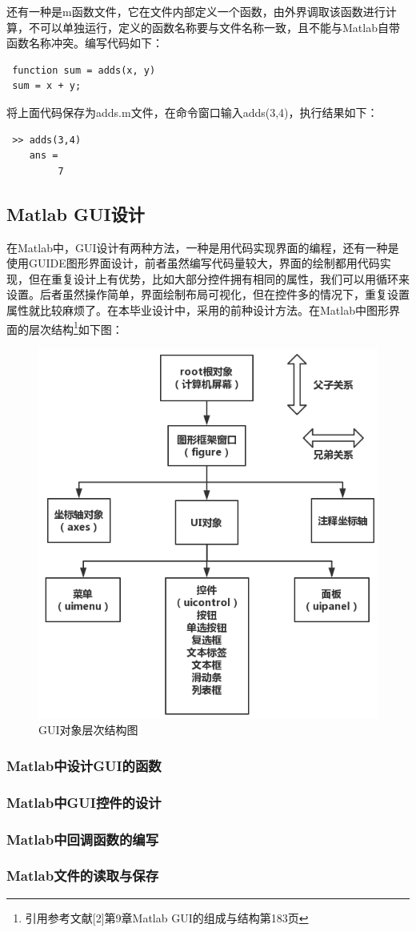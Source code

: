 还有一种是m函数文件，它在文件内部定义一个函数，由外界调取该函数进行计算，不可以单独运行，定义的函数名称要与文件名称一致，且不能与Matlab自带函数名称冲突。编写代码如下：
\begin{lstlisting}
 function sum = adds(x, y)
 sum = x + y;\end{lstlisting}
将上面代码保存为adds.m文件，在命令窗口输入adds(3,4)，执行结果如下：
\begin{lstlisting}
 >> adds(3,4)
 	ans =
		 7\end{lstlisting}
\subsection{Matlab GUI设计}
在Matlab中，GUI设计有两种方法，一种是用代码实现界面的编程，还有一种是使用GUIDE图形界面设计，前者虽然编写代码量较大，界面的绘制都用代码实现，但在重复设计上有优势，比如大部分控件拥有相同的属性，我们可以用循环来设置。后者虽然操作简单，界面绘制布局可视化，但在控件多的情况下，重复设置属性就比较麻烦了。在本毕业设计中，采用的前种设计方法。在Matlab中图形界面的层次结构\footnote{引用参考文献[2]第9章Matlab GUI的组成与结构第183页}如下图：
\begin{figure}[H]
	\centering
	\includegraphics[scale=0.5]{MatlabGUI}
	\caption{GUI对象层次结构图}
\end{figure}
\subsubsection{Matlab中设计GUI的函数}

\subsubsection{Matlab中GUI控件的设计}
\subsubsection{Matlab中回调函数的编写}
\subsubsection{Matlab文件的读取与保存}